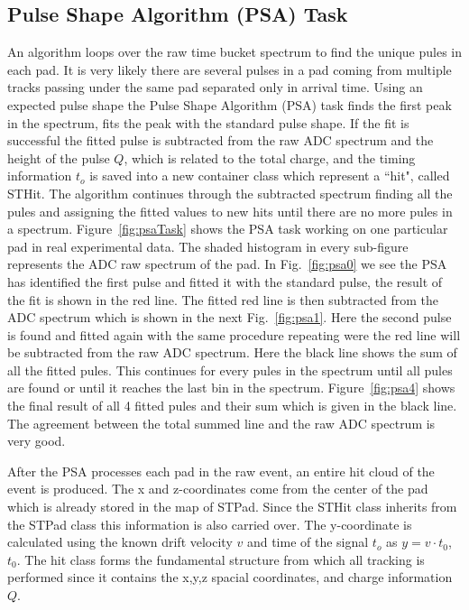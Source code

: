 \subsection{Pulse Shape Algorithm (PSA) Task}
\label{sec:psa}
An algorithm loops over the raw time bucket spectrum to find the unique pules in each pad. It is very likely there are several pulses in a pad coming from multiple tracks passing under the same pad separated only in arrival time. Using an expected pulse shape the Pulse Shape Algorithm (PSA) task finds the first peak in the spectrum, fits the peak with the standard pulse shape. If the fit is successful the fitted pulse is subtracted from the raw ADC spectrum and the height of the pulse $Q$, which is related to the total charge, and the timing information $t_o$ is saved into a new container class which represent a ``hit", called STHit. The algorithm continues through the subtracted spectrum finding all the pules and assigning the fitted values to new hits until there are no more pules in a spectrum. Figure~\ref{fig:psaTask} shows the PSA task working on one particular pad in real experimental data. The shaded histogram in every sub-figure represents the ADC raw spectrum of the pad. In Fig.~\ref{fig:psa0} we see the PSA has identified the first pulse and fitted it with the standard pulse, the result of the fit is shown in the red line. The fitted red line is then subtracted from the ADC spectrum which is shown in the next Fig.~\ref{fig:psa1}. Here the second pulse is found and fitted again with the same procedure repeating were the red line will be subtracted from the raw ADC spectrum. Here the black line shows the sum of all the fitted pules. This continues for every pules in the spectrum until all pules are found or until it reaches the last bin in the spectrum. Figure~\ref{fig:psa4} shows the final result of all 4 fitted pules and their sum which is given in the black line. The agreement between the total summed line and the raw ADC spectrum is very good. 

After the PSA processes each pad in the raw event, an entire hit cloud of the event is produced. The x and z-coordinates come from the center of the pad which is already stored in the map of STPad. Since the STHit class inherits from the STPad class this information is also carried over. The y-coordinate is calculated using the known drift velocity $v$ and time of the signal $t_o$ as $y = v\cdot t_0$, $t_0$. The hit class forms the fundamental structure from which all tracking is performed since it contains the x,y,z spacial coordinates, and charge information $Q$.


